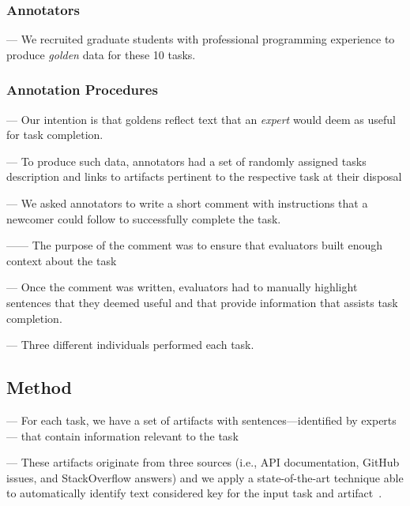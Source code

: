 \subsubsection{Annotators}

--- We recruited  graduate students with professional programming experience to produce \textit{golden} data for these 10 tasks. \vspace{3mm}


\subsubsection{Annotation Procedures}

--- Our intention is that goldens reflect text that an \textit{expert} would deem as useful for task completion. \vspace{3mm}


--- To produce such data, annotators had a set of randomly assigned tasks description and links to artifacts 
pertinent to the respective task at their disposal \vspace{3mm}

--- We asked annotators to write a short comment with instructions that a newcomer could follow to successfully complete the task.

------ The purpose of the comment was to ensure that evaluators built enough context about the task \vspace{3mm}

--- Once the comment was written,  evaluators had to manually highlight sentences that they deemed useful and that provide information that assists task completion.

--- Three different individuals performed each task. \vspace{3mm}

\subsection{Method}

--- For each task, we have a set of artifacts with sentences---identified by experts--- that contain information relevant to the task \vspace{3mm}

--- These artifacts originate from three sources (i.e., API documentation, GitHub issues, and StackOverflow answers) and we apply a state-of-the-art technique able to automatically identify text considered key for the input task and artifact~\cite{nadi2020, Robillard2015, Lotufo2012, Xu2017}. \vspace{3mm}

